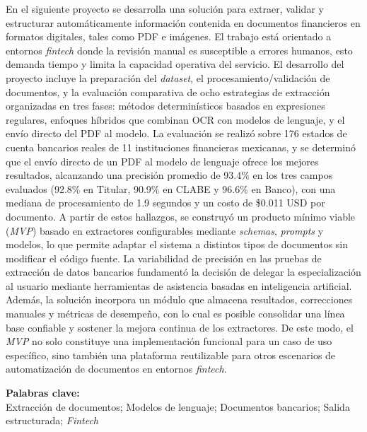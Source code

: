 \begin{resumen}

    En el siguiente proyecto se desarrolla una solución para extraer, validar y estructurar automáticamente información contenida en documentos financieros en formatos digitales, tales como PDF e imágenes. El trabajo está orientado a entornos \textit{fintech} donde la revisión manual es susceptible a errores humanos, esto demanda tiempo y limita la capacidad operativa del servicio. El desarrollo del proyecto incluye la preparación del \textit{dataset}, el procesamiento/validación de documentos, y la evaluación comparativa de ocho estrategias de extracción organizadas en tres fases: métodos determinísticos basados en expresiones regulares, enfoques híbridos que combinan OCR con modelos de lenguaje, y el envío directo del PDF al modelo. La evaluación se realizó sobre 176 estados de cuenta bancarios reales de 11 instituciones financieras mexicanas, y se determinó que el envío directo de un PDF al modelo de lenguaje ofrece los mejores resultados, alcanzando una precisión promedio de 93.4\% en los tres campos evaluados (92.8\% en Titular, 90.9\% en CLABE y 96.6\% en Banco), con una mediana de procesamiento de 1.9 segundos y un costo de \$0.011 USD por documento. A partir de estos hallazgos, se construyó un producto mínimo viable (\textit{MVP}) basado en extractores configurables mediante \textit{schemas}, \textit{prompts} y modelos, lo que permite adaptar el sistema a distintos tipos de documentos sin modificar el código fuente. La variabilidad de precisión en las pruebas de extracción de datos bancarios fundamentó la decisión de delegar la especialización al usuario mediante herramientas de asistencia basadas en inteligencia artificial. Además, la solución incorpora un módulo que almacena resultados, correcciones manuales y métricas de desempeño, con lo cual es posible consolidar una línea base confiable y sostener la mejora continua de los extractores. De este modo, el \textit{MVP} no solo constituye una implementación funcional para un caso de uso específico, sino también una plataforma reutilizable para otros escenarios de automatización de documentos en entornos \textit{fintech}.
    
    \noindent \textbf{Palabras clave:}\\
    \noindent Extracción de documentos; Modelos de lenguaje; Documentos bancarios; Salida estructurada; \textit{Fintech}
    \end{resumen}
    